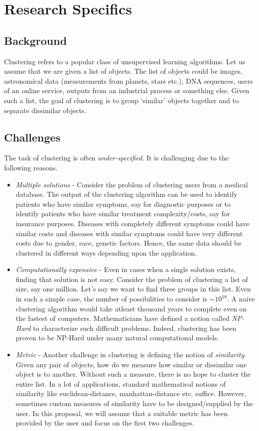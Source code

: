 \documentclass[11pt]{article}
\begin{document}
\section{Research Specifics}
\subsection{Background}
Clustering refers to a popular class of unsupervised learning algorithms. Let us assume that we are given a list of objects. The list of objects could be images, astronomical data (measurements from planets, stars etc.), DNA sequences, users of an online service, outputs from an industrial process or something else. Given such a list, the goal of clustering is to group `similar' objects together and to separate dissimilar objects.

\subsection{Challenges}
\label{subsection:challenges}
The task of clustering is often \textit{under-specified}. It is challenging due to the following reasons.
\begin{itemize}
\item \textit{Multiple solutions} - Consider the problem of clustering users from a medical database. The output of the clustering algorithm can be used to identify patients who have similar symptoms, say for diagnostic purposes or to identify patients who have similar treatment complexity/costs, say for insurance purposes. Diseases with completely different symptoms could have similar costs and diseases with similar symptoms could have very different costs due to gender, race, genetic factors.  Hence, the same data should be clustered in different ways depending upon the application. 
\item \textit{Computationally expensive} - Even in cases when a single solution exists, finding that solution is not easy. Consider the problem of clustering a list of size, say one million. Let's say we want to find three groups in this list. Even in such a simple case, the number of possibilities to consider is $\sim 10^{18}$. A naive clustering algorithm would take atleast thousand years to complete even on the fastest of computers. Mathematicians have defined a notion called \textit{NP-Hard} to characterize such difficult problems. Indeed, clustering has been proven to be NP-Hard under many natural computational models.
\item \textit{Metric} - Another challenge in clustering is defining the notion of \textit{similarity}. Given any pair of objects, how do we measure how similar or dissimilar one object is to another. Without such a measure, there is no hope to cluster the entire list. In a lot of applications, standard mathematical notions of similarity like euclidean-distance, manhattan-distance etc. suffice. However, sometimes custom measures of similarity have to be designed/supplied by the user. In this proposal, we will assume that a suitable metric has been provided by the user and focus on the first two challenges. 
\end{itemize} 
\end{document}
